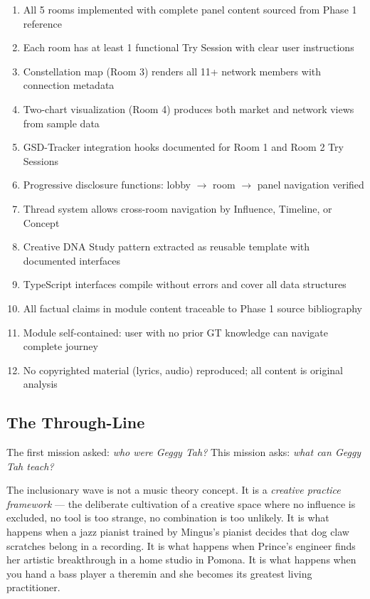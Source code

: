 \documentclass[11pt,letterpaper]{article}
\begin{document}
\begin{enumerate}[leftmargin=2em]
\item All 5 rooms implemented with complete panel content sourced from Phase 1 reference
\item Each room has at least 1 functional Try Session with clear user instructions
\item Constellation map (Room 3) renders all 11+ network members with connection metadata
\item Two-chart visualization (Room 4) produces both market and network views from sample data
\item GSD-Tracker integration hooks documented for Room 1 and Room 2 Try Sessions
\item Progressive disclosure functions: lobby $\rightarrow$ room $\rightarrow$ panel navigation verified
\item Thread system allows cross-room navigation by Influence, Timeline, or Concept
\item Creative DNA Study pattern extracted as reusable template with documented interfaces
\item TypeScript interfaces compile without errors and cover all data structures
\item All factual claims in module content traceable to Phase 1 source bibliography
\item Module self-contained: user with no prior GT knowledge can navigate complete journey
\item No copyrighted material (lyrics, audio) reproduced; all content is original analysis
\end{enumerate}

\subsection{The Through-Line}

The first mission asked: \textit{who were Geggy Tah?} This mission asks: \textit{what can Geggy Tah teach?}

The inclusionary wave is not a music theory concept. It is a \textit{creative practice framework} --- the deliberate cultivation of a creative space where no influence is excluded, no tool is too strange, no combination is too unlikely. It is what happens when a jazz pianist trained by Mingus's pianist decides that dog claw scratches belong in a recording. It is what happens when Prince's engineer finds her artistic breakthrough in a home studio in Pomona. It is what happens when you hand a bass player a theremin and she becomes its greatest living practitioner.
\end{document}
